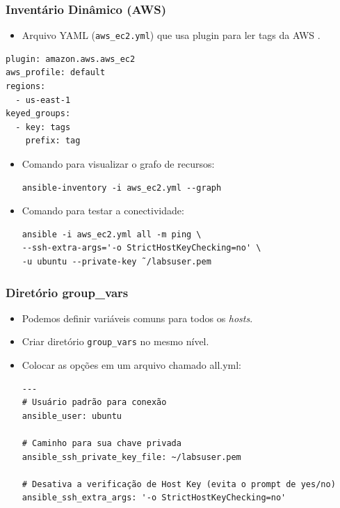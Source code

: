 \documentclass{beamer}
\begin{document}
   \begin{frame}[fragile]
      \frametitle{Inventário Dinâmico (AWS)}
      \begin{itemize}
      \item Arquivo YAML (\texttt{aws\_ec2.yml}) que usa plugin para ler tags da AWS .
      \end{itemize}
      \footnotesize
      \begin{verbatim}
plugin: amazon.aws.aws_ec2
aws_profile: default
regions:
  - us-east-1
keyed_groups:
  - key: tags
    prefix: tag
      \end{verbatim}
      \normalsize
      \begin{itemize}
      \item Comando para visualizar o grafo de recursos:
      \begin{verbatim}
ansible-inventory -i aws_ec2.yml --graph
      \end{verbatim}
      \item Comando para testar a conectividade:
      \begin{verbatim}
ansible -i aws_ec2.yml all -m ping \
--ssh-extra-args='-o StrictHostKeyChecking=no' \
-u ubuntu --private-key ˜/labsuser.pem
      \end{verbatim}
      \end{itemize}
   \end{frame}

   \begin{frame}[fragile]
        \frametitle{Diretório group\_vars}
        \begin{itemize}
        \item Podemos definir variáveis comuns para todos os \textit{hosts}.
        \item Criar diretório \texttt{group\_vars} no mesmo nível.
        \item Colocar as opções em um arquivo chamado all.yml:
        \footnotesize
        \begin{verbatim}
---
# Usuário padrão para conexão
ansible_user: ubuntu

# Caminho para sua chave privada
ansible_ssh_private_key_file: ~/labsuser.pem

# Desativa a verificação de Host Key (evita o prompt de yes/no)
ansible_ssh_extra_args: '-o StrictHostKeyChecking=no'
        \end{verbatim}
        \end{itemize}
   \end{frame}
\end{document}
